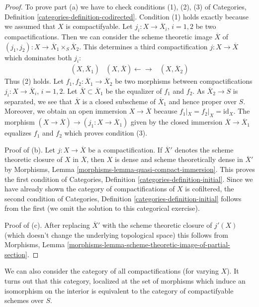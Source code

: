 \begin{proof}
To prove part (a) we have to check conditions (1), (2), (3) of
Categories, Definition \ref{categories-definition-codirected}.
Condition (1) holds exactly because we assumed that $X$
is compactifyable.
Let $j_i : X \to \overline{X}_i$, $i = 1, 2$ be two compactifications.
Then we can consider the scheme theoretic image $\overline{X}$
of $(j_1, j_2) : X \to \overline{X}_1 \times_S \overline{X}_2$.
This determines a third compactification $j : X \to \overline{X}$
which dominates both $j_i$:
$$
\begin{array}{ccc}(X, \overline{X}_1) & (X, \overline{X}) \longleftarrow\longrightarrow & (X, \overline{X}_2)\end{array}
$$
Thus (2) holds. Let $f_1, f_2 : \overline{X}_1 \to \overline{X}_2$
be two morphisms between compactifications
$j_i : X \to \overline{X}_i$, $i = 1, 2$.
Let $\overline{X} \subset \overline{X}_1$ be the equalizer of
$f_1$ and $f_2$. As $\overline{X}_2 \to S$ is separated, we see
that $\overline{X}$ is a closed subscheme of $\overline{X}_1$
and hence proper over $S$. Moreover, we obtain an
open immersion $X \to \overline{X}$ because $f_1|_X = f_2|_X = \text{id}_X$.
The morphism $(X \to \overline{X}) \to (j_1 : X \to \overline{X}_1)$
given by the closed immersion $\overline{X} \to \overline{X}_1$
equalizes $f_1$ and $f_2$ which proves condition (3).

\medskip\noindent
Proof of (b). Let $j : X \to \overline{X}$ be a compactification.
If $\overline{X}'$ denotes the scheme theoretic closure of $X$
in $\overline{X}$, then $X$ is dense and scheme theoretically dense
in $\overline{X}'$ by
Morphisms, Lemma \ref{morphisms-lemma-quasi-compact-immersion}.
This proves the first condition of
Categories, Definition \ref{categories-definition-initial}.
Since we have already shown the category of compactifications
of $X$ is cofiltered, the second condition of
Categories, Definition \ref{categories-definition-initial}
follows from the first (we omit the solution to this
categorical exercise).

\medskip\noindent
Proof of (c). After replacing $\overline{X}'$ with the scheme theoretic
closure of $j'(X)$ (which doesn't change the underlying topological space)
this follows from Morphisms, Lemma
\ref{morphisms-lemma-scheme-theoretic-image-of-partial-section}.
\end{proof}

We can also consider the category of all compactifications (for varying $X$).
It turns out that this category, localized at the set of morphisms
which induce an isomorphism on the interior
is equivalent to the category of compactifyable schemes over $S$.

